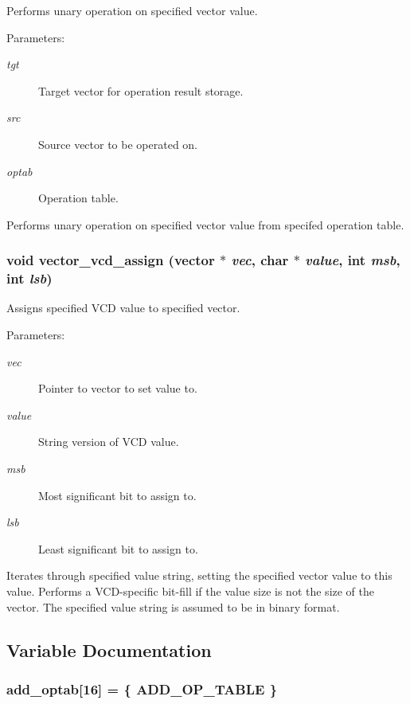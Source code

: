 Performs unary operation on specified vector value. 

\begin{Desc}
\item[Parameters:]
\begin{description}
\item[{\em tgt}]Target vector for operation result storage. \item[{\em src}]Source vector to be operated on. \item[{\em optab}]Operation table.\end{description}
\end{Desc}
Performs unary operation on specified vector value from specifed operation table. 
\subsubsection{\setlength{\rightskip}{0pt plus 5cm}void vector\_\-vcd\_\-assign ({\bf vector} $\ast$ {\em vec}, char $\ast$ {\em value}, int {\em msb}, int {\em lsb})}\label{vector_8c_a35}


Assigns specified VCD value to specified vector. 

\begin{Desc}
\item[Parameters:]
\begin{description}
\item[{\em vec}]Pointer to vector to set value to. \item[{\em value}]String version of VCD value. \item[{\em msb}]Most significant bit to assign to. \item[{\em lsb}]Least significant bit to assign to.\end{description}
\end{Desc}
Iterates through specified value string, setting the specified vector value to this value. Performs a VCD-specific bit-fill if the value size is not the size of the vector. The specified value string is assumed to be in binary format. 

\subsection{Variable Documentation}
\subsubsection{ {\bf add\_\-optab}[16] = \{ ADD\_\-OP\_\-TABLE \}}\label{vector_8c_a6}


